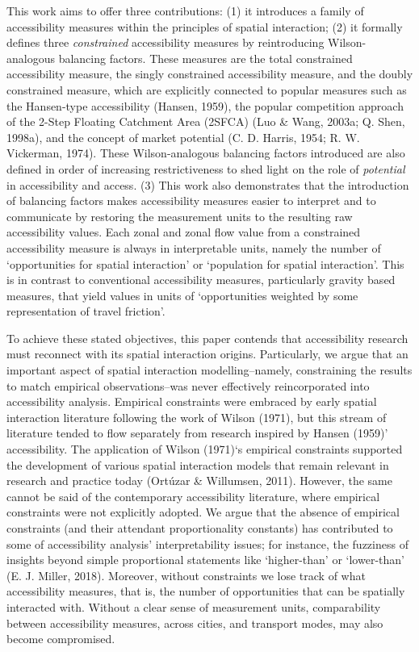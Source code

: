 \documentclass[
11pt, %
oneside, %
english, %
singlespacing, %
]{macthesis} %
\begin{document}
This work aims to offer three contributions: (1) it introduces a family of accessibility measures within the principles of spatial interaction; (2) it formally defines three \emph{constrained} accessibility measures by reintroducing Wilson-analogous balancing factors. These measures are the total constrained accessibility measure, the singly constrained accessibility measure, and the doubly constrained measure, which are explicitly connected to popular measures such as the Hansen-type accessibility (Hansen, 1959), the popular competition approach of the 2-Step Floating Catchment Area (2SFCA) (Luo \& Wang, 2003a; Q. Shen, 1998a), and the concept of market potential (C. D. Harris, 1954; R. W. Vickerman, 1974). These Wilson-analogous balancing factors introduced are also defined in order of increasing restrictiveness to shed light on the role of \emph{potential} in accessibility and access. (3) This work also demonstrates that the introduction of balancing factors makes accessibility measures easier to interpret and to communicate by restoring the measurement units to the resulting raw accessibility values. Each zonal and zonal flow value from a constrained accessibility measure is always in interpretable units, namely the number of `opportunities for spatial interaction' or `population for spatial interaction'. This is in contrast to conventional accessibility measures, particularly gravity based measures, that yield values in units of `opportunities weighted by some representation of travel friction'.

To achieve these stated objectives, this paper contends that accessibility research must reconnect with its spatial interaction origins. Particularly, we argue that an important aspect of spatial interaction modelling--namely, constraining the results to match empirical observations--was never effectively reincorporated into accessibility analysis. Empirical constraints were embraced by early spatial interaction literature following the work of Wilson (1971), but this stream of literature tended to flow separately from research inspired by Hansen (1959)' accessibility. The application of Wilson (1971)`s empirical constraints supported the development of various spatial interaction models that remain relevant in research and practice today (Ortúzar \& Willumsen, 2011). However, the same cannot be said of the contemporary accessibility literature, where empirical constraints were not explicitly adopted. We argue that the absence of empirical constraints (and their attendant proportionality constants) has contributed to some of accessibility analysis' interpretability issues; for instance, the fuzziness of insights beyond simple proportional statements like `higher-than' or `lower-than' (E. J. Miller, 2018). Moreover, without constraints we lose track of what accessibility measures, that is, the number of opportunities that can be spatially interacted with. Without a clear sense of measurement units, comparability between accessibility measures, across cities, and transport modes, may also become compromised.
\end{document}

